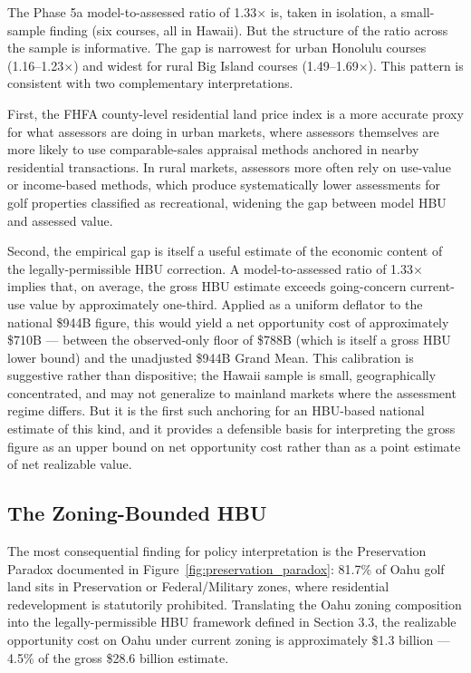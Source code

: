 \documentclass[11pt, letterpaper]{article}
\begin{document}
The Phase 5a model-to-assessed ratio of 1.33$\times$ is, taken in isolation, a small-sample finding (six courses, all in Hawaii). But the structure of the ratio across the sample is informative. The gap is narrowest for urban Honolulu courses (1.16--1.23$\times$) and widest for rural Big Island courses (1.49--1.69$\times$). This pattern is consistent with two complementary interpretations.

First, the FHFA county-level residential land price index is a more accurate proxy for what assessors are doing in urban markets, where assessors themselves are more likely to use comparable-sales appraisal methods anchored in nearby residential transactions. In rural markets, assessors more often rely on use-value or income-based methods, which produce systematically lower assessments for golf properties classified as recreational, widening the gap between model HBU and assessed value.

Second, the empirical gap is itself a useful estimate of the economic content of the legally-permissible HBU correction. A model-to-assessed ratio of 1.33$\times$ implies that, on average, the gross HBU estimate exceeds going-concern current-use value by approximately one-third. Applied as a uniform deflator to the national \$944B figure, this would yield a net opportunity cost of approximately \$710B --- between the observed-only floor of \$788B (which is itself a gross HBU lower bound) and the unadjusted \$944B Grand Mean. This calibration is suggestive rather than dispositive; the Hawaii sample is small, geographically concentrated, and may not generalize to mainland markets where the assessment regime differs. But it is the first such anchoring for an HBU-based national estimate of this kind, and it provides a defensible basis for interpreting the gross figure as an upper bound on net opportunity cost rather than as a point estimate of net realizable value.

\subsection{The Zoning-Bounded HBU}

The most consequential finding for policy interpretation is the Preservation Paradox documented in Figure~\ref{fig:preservation_paradox}: 81.7\% of Oahu golf land sits in Preservation or Federal/Military zones, where residential redevelopment is statutorily prohibited. Translating the Oahu zoning composition into the legally-permissible HBU framework defined in Section 3.3, the realizable opportunity cost on Oahu under current zoning is approximately \$1.3 billion --- 4.5\% of the gross \$28.6 billion estimate.
\end{document}

